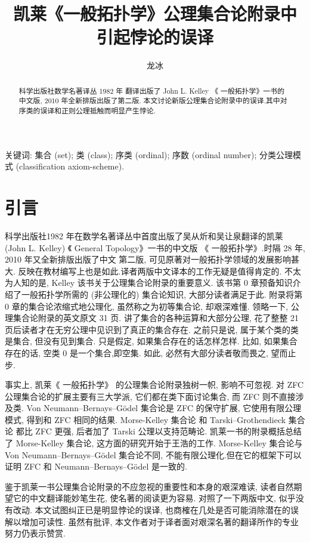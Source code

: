 \documentclass[zihao=-4,a4paper]{ctexart}
\title{凯莱《一般拓扑学》公理集合论附录中\\ 引起悖论的误译}
\author{龙\quad 冰}
\date{}
\begin{document}
\maketitle
\begin{abstract}
科学出版社数学名著译丛 1982 年 翻译出版了 John L. Kelley 《 一般拓扑学》一书的中文版,  2010 年全新排版出版了第二版.
本文讨论新版公理集合论附录中的误译.其中对序类的误译和正则公理抵触而明显产生悖论.
\end{abstract}
	
关键词: 集合 (set); 类 (class); 序类 (ordinal); 
	序数 (ordinal number); 
	分类公理模式 (classification axiom-scheme).
	
	
	
\section{引言}
科学出版社1982 年在数学名著译丛中首度出版了吴从炘和吴让泉翻译的凯莱  (John L. Kelley) 《 General  Topology》\cite{jkelley1975}一书的中文版 《 一般拓扑学》.时隔 28 年, 2010 年又全新排版出版了中文 第二版\cite{jkelley2010zh}, 可见原著对一般拓扑学领域的发展影响甚大. 反映在教材编写上也是如此\cite{PuJiangHu1985}.译者两版中文译本的工作无疑是值得肯定的. 不太为人知的是, Kelley 该书关于公理集合论附录的重要意义. 该书第 0 章预备知识介绍了一般拓扑学所需的 (非公理化的) 集合论知识, 大部分读者满足于此. 
附录将第 0 章的集合论浓缩式地公理化, 虽然称之为初等集合论, 却艰深难懂. 领略一下, 公理集合论附录的英文原文 31 页. 讲了集合的各种运算和大部分公理, 花了整整 21 页后读者才在无穷公理中见识到了真正的集合存在. 之前只是说, 属于某个类的类是集合, 但没有见到集合. 只是假定, 如果集合存在的话怎样怎样. 比如, 如果集合存在的话, 空类 0 是一个集合,即空集. 如此, 必然有大部分读者敬而畏之, 望而止步. 

事实上, 凯莱《 一般拓扑学》 的公理集合论附录独树一帜, 影响不可忽视. 对 ZFC 公理集合论\cite{jjiang1991}\cite{enderton1977}的扩展主要有三大学派\cite{wikiSetTheory}, 它们都在类下面讨论集合, 而 ZFC 则不直接涉及类. Von Neumann–Bernays–Gödel 集合论\cite{wikiNBGSetTheory}是 ZFC 的保守扩展,  它使用有限公理模式, 得到和 ZFC 相同的结果. 
Morse-Kelley 集合论\cite{wikiMKSetTheory} 和 Tarski–Grothendieck 集合论\cite{wikiTGSetTheory} 都比 ZFC 更强, 后者加了 Tarski 公理以支持范畴论. 凯莱一书的附录概括总结了 Morse-Kelley 集合论,
这方面的研究开始于王浩的工作\cite{wang1949}. Morse-Kelley 集合论与 Von Neumann–Bernays–Gödel  集合论不同, 不能有限公理化.但在它的框架下可以证明 ZFC 和 Neumann–Bernays–Gödel 是一致的.

鉴于凯莱一书公理集合论附录的不应忽视的重要性和本身的艰深难读, 读者自然期望它的中文翻译能妙笔生花, 使名著的阅读更为容易. 对照了一下两版中文, 似乎没有改动. 本文试图纠正已是明显悖论的误译, 也商榷在几处是否可能消除潜在的误解以增加可读性. 虽然有批评, 本文作者对于译者面对艰深名著的翻译所作的专业努力仍表示赞赏.
	
\end{document}
